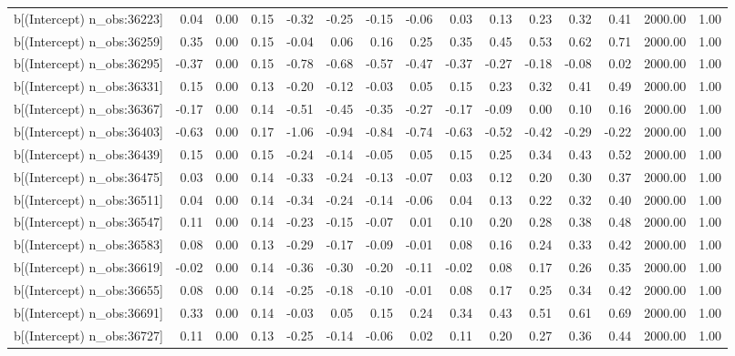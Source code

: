 \begin{table}[ht]
\begin{tabular}{rrrrrrrrrrrrrrr}
  b[(Intercept) n\_obs:36223] & 0.04 & 0.00 & 0.15 & -0.32 & -0.25 & -0.15 & -0.06 & 0.03 & 0.13 & 0.23 & 0.32 & 0.41 & 2000.00 & 1.00 \\ 
  b[(Intercept) n\_obs:36259] & 0.35 & 0.00 & 0.15 & -0.04 & 0.06 & 0.16 & 0.25 & 0.35 & 0.45 & 0.53 & 0.62 & 0.71 & 2000.00 & 1.00 \\ 
  b[(Intercept) n\_obs:36295] & -0.37 & 0.00 & 0.15 & -0.78 & -0.68 & -0.57 & -0.47 & -0.37 & -0.27 & -0.18 & -0.08 & 0.02 & 2000.00 & 1.00 \\ 
  b[(Intercept) n\_obs:36331] & 0.15 & 0.00 & 0.13 & -0.20 & -0.12 & -0.03 & 0.05 & 0.15 & 0.23 & 0.32 & 0.41 & 0.49 & 2000.00 & 1.00 \\ 
  b[(Intercept) n\_obs:36367] & -0.17 & 0.00 & 0.14 & -0.51 & -0.45 & -0.35 & -0.27 & -0.17 & -0.09 & 0.00 & 0.10 & 0.16 & 2000.00 & 1.00 \\ 
  b[(Intercept) n\_obs:36403] & -0.63 & 0.00 & 0.17 & -1.06 & -0.94 & -0.84 & -0.74 & -0.63 & -0.52 & -0.42 & -0.29 & -0.22 & 2000.00 & 1.00 \\ 
  b[(Intercept) n\_obs:36439] & 0.15 & 0.00 & 0.15 & -0.24 & -0.14 & -0.05 & 0.05 & 0.15 & 0.25 & 0.34 & 0.43 & 0.52 & 2000.00 & 1.00 \\ 
  b[(Intercept) n\_obs:36475] & 0.03 & 0.00 & 0.14 & -0.33 & -0.24 & -0.13 & -0.07 & 0.03 & 0.12 & 0.20 & 0.30 & 0.37 & 2000.00 & 1.00 \\ 
  b[(Intercept) n\_obs:36511] & 0.04 & 0.00 & 0.14 & -0.34 & -0.24 & -0.14 & -0.06 & 0.04 & 0.13 & 0.22 & 0.32 & 0.40 & 2000.00 & 1.00 \\ 
  b[(Intercept) n\_obs:36547] & 0.11 & 0.00 & 0.14 & -0.23 & -0.15 & -0.07 & 0.01 & 0.10 & 0.20 & 0.28 & 0.38 & 0.48 & 2000.00 & 1.00 \\ 
  b[(Intercept) n\_obs:36583] & 0.08 & 0.00 & 0.13 & -0.29 & -0.17 & -0.09 & -0.01 & 0.08 & 0.16 & 0.24 & 0.33 & 0.42 & 2000.00 & 1.00 \\ 
  b[(Intercept) n\_obs:36619] & -0.02 & 0.00 & 0.14 & -0.36 & -0.30 & -0.20 & -0.11 & -0.02 & 0.08 & 0.17 & 0.26 & 0.35 & 2000.00 & 1.00 \\ 
  b[(Intercept) n\_obs:36655] & 0.08 & 0.00 & 0.14 & -0.25 & -0.18 & -0.10 & -0.01 & 0.08 & 0.17 & 0.25 & 0.34 & 0.42 & 2000.00 & 1.00 \\ 
  b[(Intercept) n\_obs:36691] & 0.33 & 0.00 & 0.14 & -0.03 & 0.05 & 0.15 & 0.24 & 0.34 & 0.43 & 0.51 & 0.61 & 0.69 & 2000.00 & 1.00 \\ 
  b[(Intercept) n\_obs:36727] & 0.11 & 0.00 & 0.13 & -0.25 & -0.14 & -0.06 & 0.02 & 0.11 & 0.20 & 0.27 & 0.36 & 0.44 & 2000.00 & 1.00 \\ 

\end{tabular}
\end{table}
